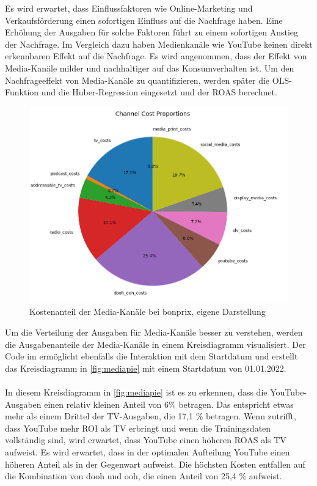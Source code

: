 \noindent
Es wird erwartet, dass Einflussfaktoren wie Online-Marketing und Verkaufsförderung einen sofortigen Einfluss auf die Nachfrage haben. Eine Erhöhung der Ausgaben für solche Faktoren führt zu einem sofortigen Anstieg der Nachfrage. Im Vergleich dazu haben Medienkanäle wie YouTube keinen direkt erkennbaren Effekt auf die Nachfrage. Es wird angenommen, dass der Effekt von Media-Kanäle milder und nachhaltiger auf das Konsumverhalten ist. Um den Nachfrageeffekt von Media-Kanäle zu quantifizieren, werden später die \ac{OLS}-Funktion und die Huber-Regression eingesetzt und der \ac{ROAS} berechnet.
\begin{figure}[H]
    \centering
    \includegraphics[width=0.8\linewidth]{images/mediapie.png}
    \caption{Kostenanteil der Media-Kanäle bei bonprix, eigene Darstellung}
    \label{fig:mediapie}
\end{figure}
\noindent
Um die Verteilung der Ausgaben für Media-Kanäle besser zu verstehen, werden die Ausgabenanteile der Media-Kanäle in einem Kreisdiagramm visualisiert. Der Code im  ermöglicht ebenfalls die Interaktion mit dem Startdatum und erstellt das Kreisdiagramm in \autoref{fig:mediapie} mit einem Startdatum von 01.01.2022.\\\\
In diesem Kreisdiagramm in \autoref{fig:mediapie} ist es zu erkennen, dass die YouTube-Ausgaben einen relativ kleinen Anteil von 6\% betragen. Das entspricht etwas mehr als einem Drittel der TV-Ausgaben, die 17,1 \% betragen. Wenn  zutrifft, dass YouTube mehr \ac{ROI} als TV erbringt und wenn die Trainingsdaten vollständig sind, wird erwartet, dass YouTube einen höheren \ac{ROAS} als TV aufweist. Es wird erwartet, dass in der optimalen Aufteilung YouTube einen höheren Anteil als in der Gegenwart aufweist. Die höchsten Kosten entfallen auf die Kombination von \ac{dooh} und \ac{ooh}, die einen Anteil von 25,4 \% aufweist.
\newpage
